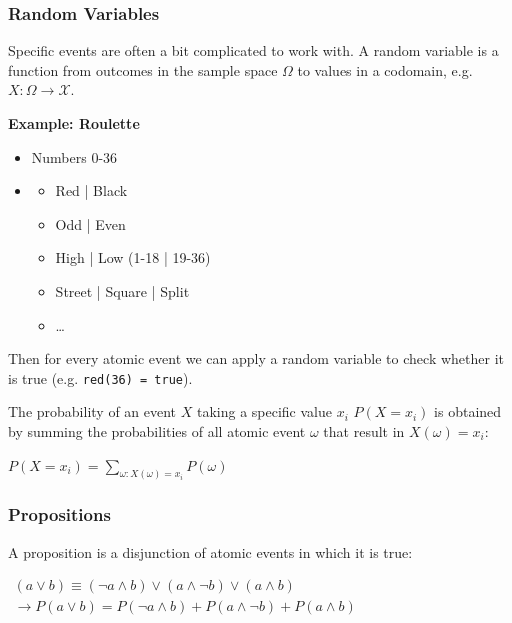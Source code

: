 \documentclass[
../EiKI_Summary.tex,
]
{subfiles}
\begin{document}
\subsubsection{Random Variables}
Specific events are often a bit complicated to work with. A random variable is a function from outcomes in the sample space $\Omega$ to values in a codomain, e.g. $X: \Omega \rightarrow \mathcal{X}$.

\textbf{Example: Roulette}
\begin{itemize}
    \item {} Numbers 0-36
    \item {}
    \begin{itemize}
        \item Red | Black
        \item Odd | Even
        \item High | Low (1-18 | 19-36)
        \item Street | Square | Split
        \item \dots
    \end{itemize}
\end{itemize}

Then for every atomic event we can apply a random variable to check whether it is true (e.g. \texttt{red(36) = true}).

The probability of an event $X$ taking a specific value $x_i$ $P(X = x_i)$ is obtained by summing the probabilities of all atomic event $\omega$ that result in $X(\omega) = x_i$:

\begin{csmb*}
    $\displaystyle P(X = x_i) = \sum_{\omega:X(\omega) = x_i} P(\omega)$
\end{csmb*}

\subsubsection{Propositions}
A proposition is a disjunction of atomic events in which it is true:

\begin{csmb*}
    $\begin{gathered}
        (a\lor b) \equiv (\neg a\land b) \lor (a \land\neg b) \lor (a \land b)\\
        \rightarrow P(a\lor b) = P(\neg a\land b) + P(a\land \neg b) + P(a\land b)
    \end{gathered}$
\end{csmb*}
\end{document}
